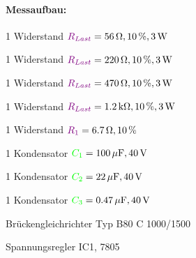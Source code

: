 \documentclass[11pt,a4paper,titlepage,parskip=half]{scrreprt}
\begin{document}
            \paragraph{Messaufbau:}
            \begin{itemize*}
                \item 1 Widerstand $\textcolor{violet}{R_{Last}} = \SI{56}{\ohm}, 10\,\%, \SI{3}{\watt}$
                \item 1 Widerstand $\textcolor{violet}{R_{Last}} = \SI{220}{\ohm}, 10\,\%, \SI{3}{\watt}$
                \item 1 Widerstand $\textcolor{violet}{R_{Last}} = \SI{470}{\ohm}, 10\,\%, \SI{3}{\watt}$
                \item 1 Widerstand $\textcolor{violet}{R_{Last}} = \SI{1,2}{\kilo\ohm}, 10\,\%, \SI{3}{\watt}$
                \item 1 Widerstand $\textcolor{violet}{R_1} = \SI{6,7}{\ohm}, 10\,\%$
                \item 1 Kondensator $\textcolor{green}{C_1} = \SI{100}{\mu\farad}, \SI{40}{\volt}$
                \item 1 Kondensator $\textcolor{green}{C_2} = \SI{22}{\mu\farad}, \SI{40}{\volt}$
                \item 1 Kondensator $\textcolor{green}{C_3} = \SI{0,47}{\mu\farad}, \SI{40}{\volt}$
                \item Brückengleichrichter Typ B80 C 1000/1500
                \item Spannungsregler IC1, 7805
            \end{itemize*}
\end{document}
